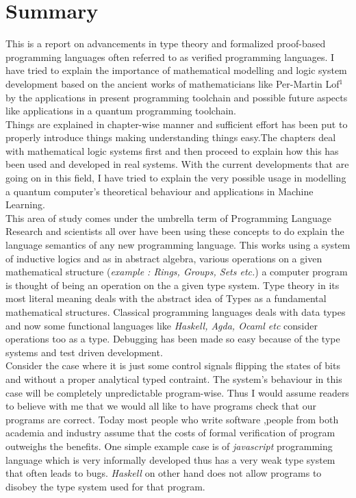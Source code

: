 \chapter*{Summary}

This is a report on advancements in type theory and formalized proof-based programming languages often referred to as verified programming languages. I have tried to explain the importance of mathematical modelling and logic system development based on the ancient works of mathematicians like Per-Martin Lof$^{1}$  by the applications in present programming toolchain and possible future aspects like applications in a quantum  programming toolchain.\\

Things are explained in chapter-wise manner and sufficient effort has been put to properly introduce things making understanding things easy.The chapters deal with mathematical logic systems first and then proceed to explain how this has been used and developed in real systems. With the current developments that are going on in this field, I have tried to explain the very possible usage in modelling a quantum computer's theoretical behaviour and applications in Machine Learning.\\

This area of study comes under the umbrella term of Programming Language Research and scientists all over have been  using these concepts to do explain the language semantics of any new programming language. This works using a system of inductive logics and as in abstract algebra, various operations on a given mathematical structure (\textit{example : Rings, Groups, Sets etc.}) a computer program is thought of being an operation on the a given type system. Type theory in its most literal meaning deals with the abstract idea of Types as a fundamental mathematical structures. Classical programming languages deals with data types and now some functional languages like \textit{Haskell, Agda, Ocaml etc} consider operations too as a type. Debugging has been made so easy because of the type systems and test driven development.\\

Consider the case where it is just some control signals flipping the states of bits and without a proper analytical typed contraint. The system's behaviour in this case will be completely unpredictable program-wise. Thus I would assume readers to believe with me that we would all like to have programs check that our programs are correct. Today most people who write software ,people from both academia and industry assume that the costs of formal verification of program outweighs the benefits. One simple example case is of \textit{javascript} programming language which is very informally developed thus has a very weak type system that often leads to bugs.  \textit{Haskell} on other hand does not allow programs to disobey the type system used for that program.\\ 
